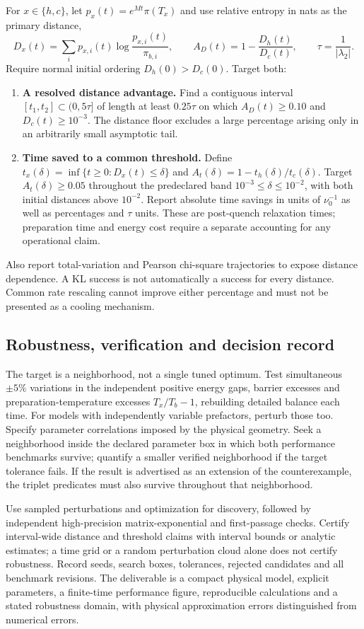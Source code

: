 \documentclass[11pt]{article}
\begin{document}
For $x\in\{h,c\}$, let $p_x(t)=e^{Mt}\pi(T_x)$ and use relative entropy
in nats as the primary distance,
\[
 D_x(t)=\sum_i p_{x,i}(t)\log\frac{p_{x,i}(t)}{\pi_{b,i}},
 \qquad
 A_D(t)=1-\frac{D_h(t)}{D_c(t)},\qquad
 \tau=\frac{1}{|\lambda_2|}.
\]
Require normal initial ordering $D_h(0)>D_c(0)$. Target both:
\begin{enumerate}
\item \textbf{A resolved distance advantage.}
Find a contiguous interval $[t_1,t_2]\subset(0,5\tau]$ of length at least
$0.25\tau$ on which $A_D(t)\geq0.10$ and $D_c(t)\geq10^{-3}$.
The distance floor excludes a large percentage arising only in an
arbitrarily small asymptotic tail.
\item \textbf{Time saved to a common threshold.}
Define $t_x(\delta)=\inf\{t\geq0:D_x(t)\leq\delta\}$ and
$A_t(\delta)=1-t_h(\delta)/t_c(\delta)$.
Target $A_t(\delta)\geq0.05$ throughout the predeclared band
$10^{-3}\leq\delta\leq10^{-2}$, with both initial distances above $10^{-2}$.
Report absolute time savings in units of $\nu_0^{-1}$ as well as percentages
and $\tau$ units. These are post-quench relaxation times; preparation time
and energy cost require a separate accounting for any operational claim.
\end{enumerate}
Also report total-variation and Pearson chi-square trajectories to expose
distance dependence. A KL success is not automatically a success for every
distance. Common rate rescaling cannot improve either percentage and must
not be presented as a cooling mechanism.

\subsection{Robustness, verification and decision record}
The target is a neighborhood, not a single tuned optimum. Test simultaneous
$\pm5\%$ variations in the independent positive energy gaps, barrier
excesses and preparation-temperature excesses $T_x/T_b-1$, rebuilding
detailed balance each time. For models with independently variable
prefactors, perturb those too. Specify parameter correlations imposed by
the physical geometry. Seek a neighborhood inside the declared parameter
box in which both performance benchmarks survive; quantify a smaller
verified neighborhood if the target tolerance fails. If the result is
advertised as an extension of the counterexample, the triplet predicates
must also survive throughout that neighborhood.

Use sampled perturbations and optimization for discovery, followed by
independent high-precision matrix-exponential and first-passage checks.
Certify interval-wide distance and threshold claims with interval bounds
or analytic estimates; a time grid or a random perturbation cloud alone
does not certify robustness. Record seeds, search boxes, tolerances,
rejected candidates and all benchmark revisions. The deliverable is a
compact physical model, explicit parameters, a finite-time performance
figure, reproducible calculations and a stated robustness domain, with
physical approximation errors distinguished from numerical errors.
\end{document}
